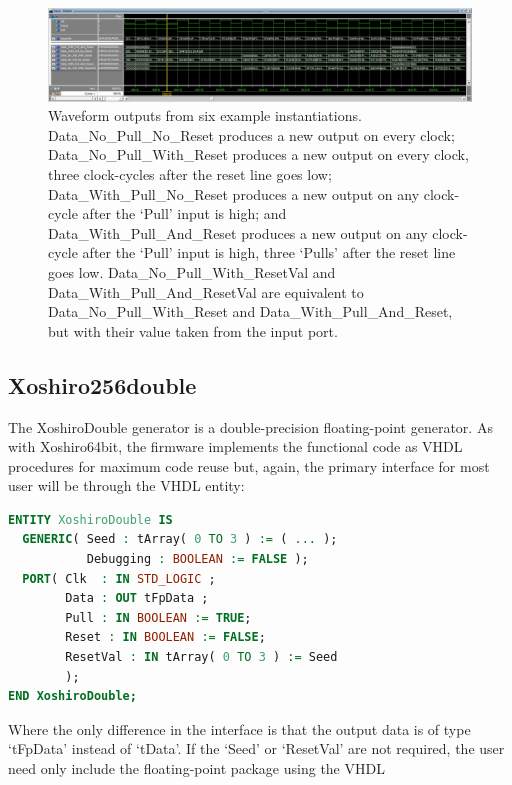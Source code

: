 \documentclass{article}
\begin{document}
\begin{figure}[ht]
\centering
\includegraphics[width=\textwidth]{ModelsimGui.png}
\caption{Waveform outputs from six example instantiations. Data\_No\_Pull\_No\_Reset produces a new output on every clock; Data\_No\_Pull\_With\_Reset produces a new output on every clock, three clock-cycles after the reset line goes low; Data\_With\_Pull\_No\_Reset produces a new output on any clock-cycle after the `Pull' input is high; and Data\_With\_Pull\_And\_Reset produces a new output on any clock-cycle after the `Pull' input is high, three `Pulls' after the reset line goes low. Data\_No\_Pull\_With\_ResetVal and Data\_With\_Pull\_And\_ResetVal are equivalent to Data\_No\_Pull\_With\_Reset and Data\_With\_Pull\_And\_Reset, but with their value taken from the input port.}
\label{fig:Modelsim_GUI_output}
\end{figure}

\subsection{Xoshiro256double}

The XoshiroDouble generator is a double-precision floating-point generator. As with Xoshiro64bit, the firmware implements the functional code as VHDL procedures for maximum code reuse but, again, the primary interface for most user will be through the VHDL entity:

\begin{minipage}{1.0\textwidth}
\centering
\begin{lstlisting}[language=VHDL, label=lst:XoshiroDouble_entity]
ENTITY XoshiroDouble IS
  GENERIC( Seed : tArray( 0 TO 3 ) := ( ... );
           Debugging : BOOLEAN := FALSE );
  PORT( Clk  : IN STD_LOGIC ;
        Data : OUT tFpData ;
        Pull : IN BOOLEAN := TRUE;
        Reset : IN BOOLEAN := FALSE;
        ResetVal : IN tArray( 0 TO 3 ) := Seed
        );
END XoshiroDouble;
\end{lstlisting}
\end{minipage}

Where the only difference in the interface is that the output data is of type `tFpData' instead of `tData'. If the `Seed' or `ResetVal' are not required, the user need only include the floating-point package using the VHDL
\end{document}
